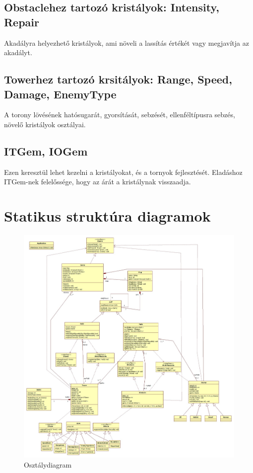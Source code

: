\subsection{Obstaclehez tartozó kristályok: Intensity, Repair}
Akadályra helyezhető kristályok, ami növeli a lassítás értékét vagy megjavítja az akadályt.

\subsection{Towerhez tartozó krsitályok: Range, Speed, Damage, EnemyType}
A torony lövésének hatósugarát, gyorsítását, sebzését, ellenféltípusra sebzés, növelő kristályok osztályai.

\subsection{ITGem, IOGem}
Ezen keresztül lehet kezelni a kristályokat, és a tornyok fejlesztését. Eladáshoz ITGem-nek felelőssége, hogy az árát a kristálynak visszaadja.




\section{Statikus struktúra diagramok}

\begin{figure}[H]
\begin{center}
\includegraphics[width=17cm]{chapters/chapter04/images/Main.jpg}
\caption{Osztálydiagram}
\label{fig:Osztálydiagram}
\end{center}
\end{figure}


